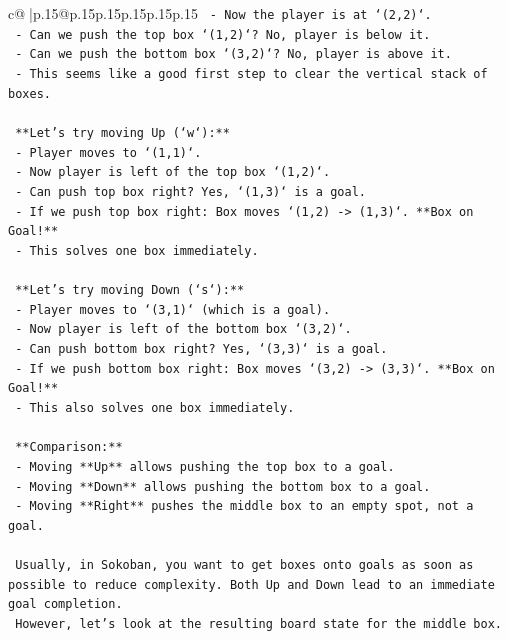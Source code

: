 \documentclass{article}
\begin{document}
{\begin{supertabular}{c@{$\;$}|p{.15\linewidth}@{}p{.15\linewidth}p{.15\linewidth}p{.15\linewidth}p{.15\linewidth}p{.15\linewidth}}
{{{\texttt{    {-} Now the player is at `(2,2)`.} \\
\texttt{    {-} Can we push the top box `(1,2)`? No, player is below it.} \\
\texttt{    {-} Can we push the bottom box `(3,2)`? No, player is above it.} \\
\texttt{    {-} This seems like a good first step to clear the vertical stack of boxes.} \\
\\ 
\texttt{    **Let's try moving Up (`w`):**} \\
\texttt{    {-} Player moves to `(1,1)`.} \\
\texttt{    {-} Now player is left of the top box `(1,2)`.} \\
\texttt{    {-} Can push top box right? Yes, `(1,3)` is a goal.} \\
\texttt{    {-} If we push top box right: Box moves `(1,2) {-}> (1,3)`. **Box on Goal!**} \\
\texttt{    {-} This solves one box immediately.} \\
\\ 
\texttt{    **Let's try moving Down (`s`):**} \\
\texttt{    {-} Player moves to `(3,1)` (which is a goal).} \\
\texttt{    {-} Now player is left of the bottom box `(3,2)`.} \\
\texttt{    {-} Can push bottom box right? Yes, `(3,3)` is a goal.} \\
\texttt{    {-} If we push bottom box right: Box moves `(3,2) {-}> (3,3)`. **Box on Goal!**} \\
\texttt{    {-} This also solves one box immediately.} \\
\\ 
\texttt{    **Comparison:**} \\
\texttt{    {-} Moving **Up** allows pushing the top box to a goal.} \\
\texttt{    {-} Moving **Down** allows pushing the bottom box to a goal.} \\
\texttt{    {-} Moving **Right** pushes the middle box to an empty spot, not a goal.} \\
\\ 
\texttt{    Usually, in Sokoban, you want to get boxes onto goals as soon as possible to reduce complexity. Both Up and Down lead to an immediate goal completion.} \\
\texttt{    However, let's look at the resulting board state for the middle box.} \\
}}}
\end{supertabular}}
\end{document}
